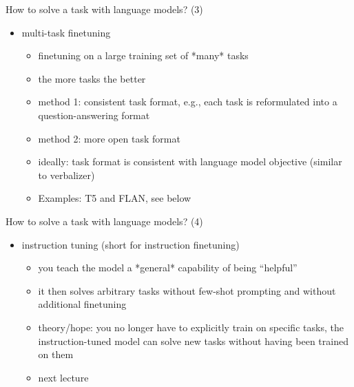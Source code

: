 \begin{frame}{How to solve a task with language models? (3)}

\vfill

\begin{itemize}
\item multi-task finetuning
        \begin{itemize}
        \item finetuning on a large training set of *many* tasks
        \item the more tasks the better
        \item method 1: consistent task format, e.g., each
        task is reformulated into a question-answering format
        \item method 2: more open task format
\item ideally: task format is
consistent with language model
            objective (similar to verbalizer)
            \item Examples: T5 and FLAN, see below
        \end{itemize}
\end{itemize}

\vfill

\end{frame}

\begin{frame}{How to solve a task with language models? (4)}

\vfill

\begin{itemize}
\item instruction tuning (short for instruction finetuning)
        \begin{itemize}
            \item you teach the model a *general*
            capability of being ``helpful''
            \item it then solves arbitrary tasks without few-shot
            prompting and without additional finetuning
            \item theory/hope: you no longer have to explicitly
            train on specific tasks, the instruction-tuned
            model can solve new tasks without having been
            trained on them
            \item next lecture
        \end{itemize}
\end{itemize}

\vfill

\end{frame}

